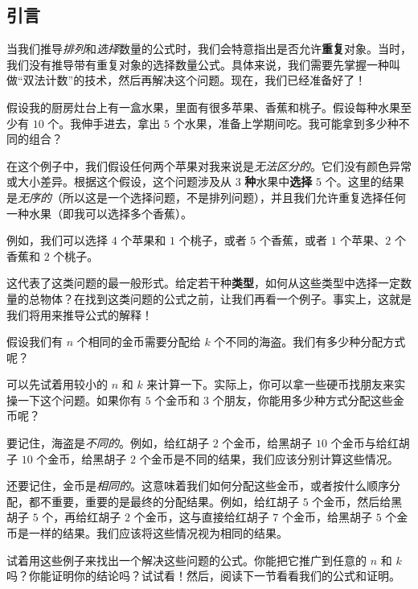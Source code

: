 
\subsection{引言}

当我们推导\emph{排列}和\emph{选择}数量的公式时，我们会特意指出是否允许\textbf{重复}对象。当时，我们没有推导带有重复对象的选择数量公式。具体来说，我们需要先掌握一种叫做``双法计数''的技术，然后再解决这个问题。现在，我们已经准备好了！

\begin{example}
    假设我的厨房灶台上有一盒水果，里面有很多苹果、香蕉和桃子。假设每种水果至少有 $10$ 个。我伸手进去，拿出 $5$ 个水果，准备上学期间吃。我可能拿到多少种不同的组合？

    在这个例子中，我们假设任何两个苹果对我来说是\emph{无法区分的}。它们没有颜色异常或大小差异。根据这个假设，这个问题涉及从 $3$ \textbf{种}水果中\textbf{选择} $5$ 个。这里的结果是\emph{无序的}（所以这是一个选择问题，不是排列问题），并且我们允许重复选择任何一种水果（即我可以选择多个香蕉）。

    例如，我们可以选择 $4$ 个苹果和 $1$ 个桃子，或者 $5$ 个香蕉，或者 $1$ 个苹果、$2$ 个香蕉和 $2$ 个桃子。

    这代表了这类问题的最一般形式。给定若干种\textbf{类型}，如何从这些类型中选择一定数量的总物体？在找到这类问题的公式之前，让我们再看一个例子。事实上，这就是我们将用来推导公式的解释！
\end{example}

\begin{example}
    假设我们有 $n$ 个相同的金币需要分配给 $k$ 个不同的海盗。我们有多少种分配方式呢？

    可以先试着用较小的 $n$ 和 $k$ 来计算一下。实际上，你可以拿一些硬币找朋友来实操一下这个问题。如果你有 $5$ 个金币和 $3$ 个朋友，你能用多少种方式分配这些金币呢？
    
    要记住，海盗是\emph{不同的}。例如，给红胡子 $2$ 个金币，给黑胡子 $10$ 个金币与给红胡子 $10$ 个金币，给黑胡子 $2$ 个金币是不同的结果，我们应该分别计算这些情况。
    
    还要记住，金币是\emph{相同的}。这意味着我们如何分配这些金币，或者按什么顺序分配，都不重要，重要的是最终的分配结果。例如，给红胡子 $5$ 个金币，然后给黑胡子 $5$ 个，再给红胡子 $2$ 个金币，这与直接给红胡子 $7$ 个金币，给黑胡子 $5$ 个金币是一样的结果。我们应该将这些情况视为相同的结果。
\end{example}

试着用这些例子来找出一个解决这些问题的公式。你能把它推广到任意的 $n$ 和 $k$ 吗？你能证明你的结论吗？试试看！然后，阅读下一节看看我们的公式和证明。